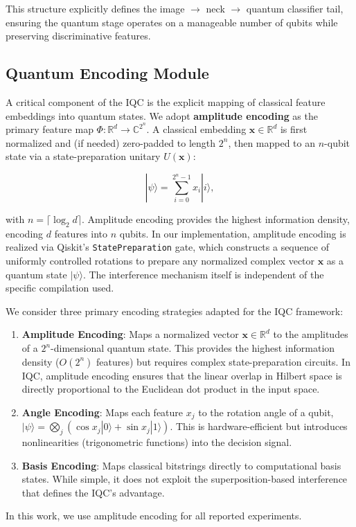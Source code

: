 \documentclass[conference]{IEEEtran}
\begin{document}
This structure explicitly defines the image $\rightarrow$ neck $\rightarrow$ quantum classifier tail, ensuring the quantum stage operates on a manageable number of qubits while preserving discriminative features.

\subsection{Quantum Encoding Module}
A critical component of the IQC is the explicit mapping of classical feature embeddings into quantum states. We adopt \textbf{amplitude encoding} as the primary feature map $\Phi: \mathbb{R}^d \rightarrow \mathbb{C}^{2^n}$. A classical embedding $\mathbf{x} \in \mathbb{R}^d$ is first normalized and (if needed) zero-padded to length $2^n$, then mapped to an $n$-qubit state via a state-preparation unitary $U(\mathbf{x})$:

\begin{equation}
|\psi\rangle = \sum_{i=0}^{2^n - 1} x_i |i\rangle,
\end{equation}

with $n = \lceil \log_2 d \rceil$. Amplitude encoding provides the highest information density, encoding $d$ features into $n$ qubits. In our implementation, amplitude encoding is realized via Qiskit's \texttt{StatePreparation} gate, which constructs a sequence of uniformly controlled rotations to prepare any normalized complex vector $\mathbf{x}$ as a quantum state $|\psi\rangle$. The interference mechanism itself is independent of the specific compilation used.

We consider three primary encoding strategies adapted for the IQC framework:
\begin{enumerate}
    \item \textbf{Amplitude Encoding}: Maps a normalized vector $\mathbf{x} \in \mathbb{R}^d$ to the amplitudes of a $2^n$-dimensional quantum state. This provides the highest information density ($O(2^n)$ features) but requires complex state-preparation circuits. In IQC, amplitude encoding ensures that the linear overlap in Hilbert space is directly proportional to the Euclidean dot product in the input space.
    \item \textbf{Angle Encoding}: Maps each feature $x_j$ to the rotation angle of a qubit, $|\psi\rangle = \bigotimes_j ( \cos x_j |0\rangle + \sin x_j |1\rangle)$. This is hardware-efficient but introduces nonlinearities (trigonometric functions) into the decision signal.
    \item \textbf{Basis Encoding}: Maps classical bitstrings directly to computational basis states. While simple, it does not exploit the superposition-based interference that defines the IQC's advantage.
\end{enumerate}
In this work, we use amplitude encoding for all reported experiments.
\end{document}
